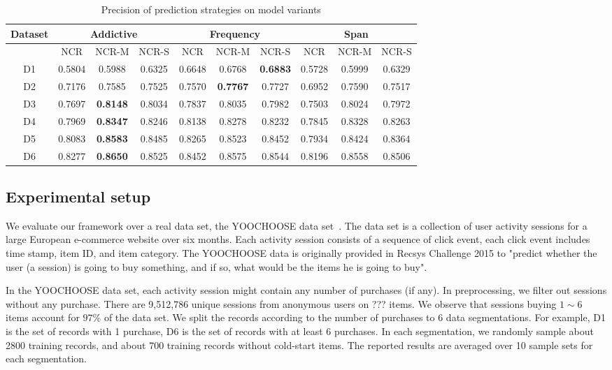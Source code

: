 \documentclass[sigconf]{acmart}
\begin{document}
\begin{table*}[htbp]
\caption{Precision of prediction strategies on model variants }
\label{tab:strategy}
\begin{tabular}{|c|c|c|c|c|c|c|c|c|c|}
\hline
Dataset & \multicolumn{3}{|c|}{Addictive} &  \multicolumn{3}{|c|}{Frequency} & \multicolumn{3}{|c|}{Span} \\\hline
  & NCR & NCR-M & NCR-S  & NCR & NCR-M & NCR-S  & NCR & NCR-M & NCR-S \\\hline
D1 & 0.5804	& 0.5988	& 0.6325& 	0.6648& 	0.6768& 	\bf{0.6883}& 	0.5728	& 0.5999	& 0.6329 \\\hline
D2& 0.7176	& 0.7585	& 0.7525	& 0.7570	& \bf{0.7767}	& 0.7727	& 0.6952	& 0.7590& 	0.7517	\\\hline
D3& 0.7697	& \bf{0.8148}	& 0.8034	& 0.7837& 	0.8035	& 0.7982	& 0.7503	& 0.8024& 	0.7972	\\\hline
D4& 0.7969& 	\bf{0.8347}	& 0.8246	& 0.8138	& 0.8278	& 0.8232& 	0.7845	& 0.8328	& 0.8263\\\hline
D5& 0.8083	& \bf{0.8583}& 	0.8485& 	0.8265& 	0.8523& 	0.8452	& 0.7934 &	0.8424& 	0.8364\\\hline
D6& 0.8277	& \bf{0.8650}	& 0.8525	& 0.8452& 	0.8575& 	0.8544& 	0.8196	& 0.8558	& 0.8506	\\ \hline 
\end{tabular}
\end{table*}

\subsection{Experimental setup}


We evaluate our framework over a real data set, the YOOCHOOSE data set~\cite{Ben-Shimon2015RecSys}. The data set is a collection of user activity sessions for a large
European e-commerce website over six months. Each activity session consists of a sequence of click event, each click event includes time stamp, item ID, and item category. The YOOCHOOSE data is originally provided in Recsys Challenge 2015 to "predict whether the user (a session) is going to buy something, and if so, what would be the items he is going to buy".


In the YOOCHOOSE data set, each activity session might contain any number of purchases (if any). In preprocessing, we filter out sessions without any purchase. There are 9,512,786 unique sessions from anonymous users on ??? items.  We observe that sessions buying $1\sim 6$ items account for $97\%$ of the data set. We split the records according to the number of purchases to 6 data segmentations. For example, D1 is the set of records with 1 purchase, D6 is the set of records with at least 6 purchases. In each segmentation, we randomly sample about 2800 training records, and about 700 training records without cold-start items. The reported results are averaged over 10  sample sets for each segmentation.
    
\end{document}
